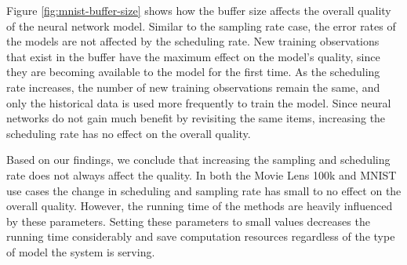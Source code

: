 \documentclass{vldb}
\begin{document}
Figure \ref{fig:mnist-buffer-size} shows how the buffer size affects the overall quality of the neural network model.
Similar to the sampling rate case, the error rates of the models are not affected by the scheduling rate.
New training observations that exist in the buffer have the maximum effect on the model's quality, since they are becoming available to the model for the first time.
As the scheduling rate increases, the number of new training observations remain the same, and only the historical data is used more frequently to train the model.
Since neural networks do not gain much benefit by revisiting the same items, increasing the scheduling rate has no effect on the overall quality.

Based on our findings, we conclude that increasing the sampling and scheduling rate does not always affect the quality.
In both the Movie Lens 100k and MNIST use cases the change in scheduling and sampling rate has small to no effect on the overall quality.
However, the running time of the methods are heavily influenced by these parameters.
Setting these parameters to small values decreases the running time considerably and save computation resources regardless of the type of model the system is serving.
\end{document}
